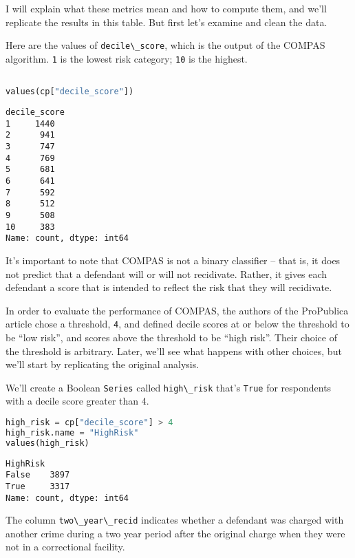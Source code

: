I will explain what these metrics mean and how to compute them, and
we'll replicate the results in this table. But first let's examine and
clean the data.

Here are the values of \passthrough{\lstinline!decile\_score!}, which is
the output of the COMPAS algorithm. \passthrough{\lstinline!1!} is the
lowest risk category; \passthrough{\lstinline!10!} is the highest.

\begin{lstlisting}[language=Python,style=source]

values(cp["decile_score"])
\end{lstlisting}

\begin{lstlisting}[style=output]
decile_score
1     1440
2      941
3      747
4      769
5      681
6      641
7      592
8      512
9      508
10     383
Name: count, dtype: int64
\end{lstlisting}

It's important to note that COMPAS is not a binary classifier -- that
is, it does not predict that a defendant will or will not recidivate.
Rather, it gives each defendant a score that is intended to reflect the
risk that they will recidivate.

In order to evaluate the performance of COMPAS, the authors of the
ProPublica article chose a threshold, \passthrough{\lstinline!4!}, and
defined decile scores at or below the threshold to be ``low risk'', and
scores above the threshold to be ``high risk''. Their choice of the
threshold is arbitrary. Later, we'll see what happens with other
choices, but we'll start by replicating the original analysis.

We'll create a Boolean \passthrough{\lstinline!Series!} called
\passthrough{\lstinline!high\_risk!} that's
\passthrough{\lstinline!True!} for respondents with a decile score
greater than 4.

\begin{lstlisting}[language=Python,style=source]
high_risk = cp["decile_score"] > 4
high_risk.name = "HighRisk"
values(high_risk)
\end{lstlisting}

\begin{lstlisting}[style=output]
HighRisk
False    3897
True     3317
Name: count, dtype: int64
\end{lstlisting}

The column \passthrough{\lstinline!two\_year\_recid!} indicates whether
a defendant was charged with another crime during a two year period
after the original charge when they were not in a correctional facility.

